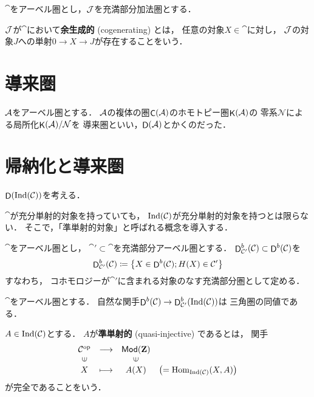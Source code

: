 \(\cat\)をアーベル圏とし，\(\mathcal{J}\)を充満部分加法圏とする．

\begin{Definition}
    \(\mathcal{J}\)が\(\cat\)において\textbf{余生成的} (cogenerating) とは，
    任意の対象\(X\in\cat\)に対し，
    \(\mathcal{J}\)の対象\(J\)への単射\(0\to{X}\to{J}\)が存在することをいう．
\end{Definition}


















\section{導来圏}

\(\mathcal{A}\)をアーベル圏とする．
\(\mathcal{A}\)の複体の圏\(\mathop{\mathsf{C}}\nolimits(\mathcal{A})\)のホモトピー圏\(\mathop{\mathsf{K}}\nolimits(\mathcal{A})\)の
零系\(\mathcal{N}\)による局所化\(\mathop{\mathsf{K}}\nolimits(\mathcal{A})/\mathcal{N}\)を
導来圏といい，\(\mathop{\mathsf{D}}\nolimits(\mathcal{A})\)とかくのだった．




\section{帰納化と導来圏}
\(\mathop{\mathsf{D}}\nolimits(\mathop{\mathrm{Ind}}(\mathcal{C}))\)を考える．

\(\cat\)が充分単射的対象を持っていても，
\(\mathop{\mathrm{Ind}}(\mathcal{C})\)が充分単射的対象を持つとは限らない．
そこで，「準単射的対象」と呼ばれる概念を導入する．

\(\cat\)をアーベル圏とし，
\(\cat'\subset\cat\)を充満部分アーベル圏とする．
\(\mathop{\mathsf{D}}\nolimits^b_{\mathcal{C}'}(\mathcal{C})\subset\mathop{\mathsf{D}}\nolimits^b(\mathcal{C})\)を
\[
    \mathop{\mathsf{D}}\nolimits^b_{\mathcal{C}'}(\mathcal{C})\coloneqq\left\{
        X\in\mathop{\mathsf{D}}\nolimits^b(\mathcal{C});H(X)\in\mathcal{C}'
    \right\}
\]
すなわち，
コホモロジーが\(\cat'\)に含まれる対象のなす充満部分圏として定める．

\begin{Proposition}
    \(\cat\)をアーベル圏とする．
    自然な関手\(\mathop{\mathsf{D}}\nolimits^b(\mathcal{C})\to\mathop{\mathsf{D}}\nolimits^b_{\mathcal{C}'}(\mathop{\mathrm{Ind}}(\mathcal{C}))\)は
    三角圏の同値である．
\end{Proposition}
\begin{Definition}
    \(A\in\mathop{\mathrm{Ind}}(\mathcal{C})\)とする．
    \(A\)が\textbf{準単射的} (quasi-injective) であるとは，
    関手\[
        \begin{array}{cccl}
            \cat^\op& \longrightarrow& \Mod(\zz)&\\
               \rotatebox{90}{$\in$}&&\rotatebox{90}{$\in$}&\\
               X&  \longmapsto&    A(X)&\left(=\Hom_{\Ind(\cat)}(X,A)\right)   
        \end{array}
    \]
    が完全であることをいう．
\end{Definition}

